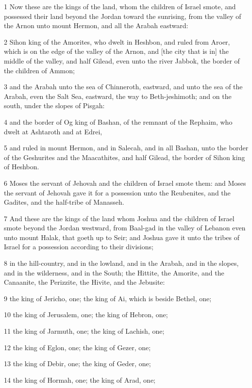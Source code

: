 \par 1 Now these are the kings of the land, whom the children of Israel smote, and possessed their land beyond the Jordan toward the sunrising, from the valley of the Arnon unto mount Hermon, and all the Arabah eastward:
\par 2 Sihon king of the Amorites, who dwelt in Heshbon, and ruled from Aroer, which is on the edge of the valley of the Arnon, and [the city that is in] the middle of the valley, and half Gilead, even unto the river Jabbok, the border of the children of Ammon;
\par 3 and the Arabah unto the sea of Chinneroth, eastward, and unto the sea of the Arabah, even the Salt Sea, eastward, the way to Beth-jeshimoth; and on the south, under the slopes of Pisgah:
\par 4 and the border of Og king of Bashan, of the remnant of the Rephaim, who dwelt at Ashtaroth and at Edrei,
\par 5 and ruled in mount Hermon, and in Salecah, and in all Bashan, unto the border of the Geshurites and the Maacathites, and half Gilead, the border of Sihon king of Heshbon.
\par 6 Moses the servant of Jehovah and the children of Israel smote them: and Moses the servant of Jehovah gave it for a possession unto the Reubenites, and the Gadites, and the half-tribe of Manasseh.
\par 7 And these are the kings of the land whom Joshua and the children of Israel smote beyond the Jordan westward, from Baal-gad in the valley of Lebanon even unto mount Halak, that goeth up to Seir; and Joshua gave it unto the tribes of Israel for a possession according to their divisions;
\par 8 in the hill-country, and in the lowland, and in the Arabah, and in the slopes, and in the wilderness, and in the South; the Hittite, the Amorite, and the Canaanite, the Perizzite, the Hivite, and the Jebusite:
\par 9 the king of Jericho, one; the king of Ai, which is beside Bethel, one;
\par 10 the king of Jerusalem, one; the king of Hebron, one;
\par 11 the king of Jarmuth, one; the king of Lachish, one;
\par 12 the king of Eglon, one; the king of Gezer, one;
\par 13 the king of Debir, one; the king of Geder, one;
\par 14 the king of Hormah, one; the king of Arad, one;

